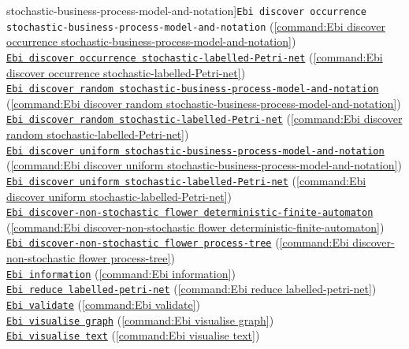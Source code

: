 {stochastic-business-process-model-and-notation]{\texttt{Ebi discover occurrence stochastic-business-process-model-and-notation}} (\cref{command:Ebi discover occurrence stochastic-business-process-model-and-notation})\\\null\qquad\hyperref[command:Ebi discover occurrence stochastic-labelled-Petri-net]{\texttt{Ebi discover occurrence stochastic-labelled-Petri-net}} (\cref{command:Ebi discover occurrence stochastic-labelled-Petri-net})\\\null\qquad\hyperref[command:Ebi discover random stochastic-business-process-model-and-notation]{\texttt{Ebi discover random stochastic-business-process-model-and-notation}} (\cref{command:Ebi discover random stochastic-business-process-model-and-notation})\\\null\qquad\hyperref[command:Ebi discover random stochastic-labelled-Petri-net]{\texttt{Ebi discover random stochastic-labelled-Petri-net}} (\cref{command:Ebi discover random stochastic-labelled-Petri-net})\\\null\qquad\hyperref[command:Ebi discover uniform stochastic-business-process-model-and-notation]{\texttt{Ebi discover uniform stochastic-business-process-model-and-notation}} (\cref{command:Ebi discover uniform stochastic-business-process-model-and-notation})\\\null\qquad\hyperref[command:Ebi discover uniform stochastic-labelled-Petri-net]{\texttt{Ebi discover uniform stochastic-labelled-Petri-net}} (\cref{command:Ebi discover uniform stochastic-labelled-Petri-net})\\\null\qquad\hyperref[command:Ebi discover-non-stochastic flower deterministic-finite-automaton]{\texttt{Ebi discover-non-stochastic flower deterministic-finite-automaton}} (\cref{command:Ebi discover-non-stochastic flower deterministic-finite-automaton})\\\null\qquad\hyperref[command:Ebi discover-non-stochastic flower process-tree]{\texttt{Ebi discover-non-stochastic flower process-tree}} (\cref{command:Ebi discover-non-stochastic flower process-tree})\\\null\qquad\hyperref[command:Ebi information]{\texttt{Ebi information}} (\cref{command:Ebi information})\\\null\qquad\hyperref[command:Ebi reduce labelled-petri-net]{\texttt{Ebi reduce labelled-petri-net}} (\cref{command:Ebi reduce labelled-petri-net})\\\null\qquad\hyperref[command:Ebi validate]{\texttt{Ebi validate}} (\cref{command:Ebi validate})\\\null\qquad\hyperref[command:Ebi visualise graph]{\texttt{Ebi visualise graph}} (\cref{command:Ebi visualise graph})\\\null\qquad\hyperref[command:Ebi visualise text]{\texttt{Ebi visualise text}} (\cref{command:Ebi visualise text})
}
